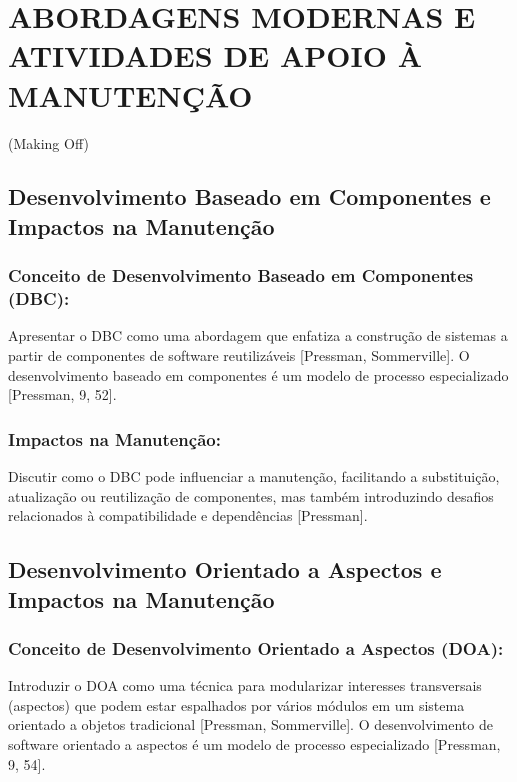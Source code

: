 \documentclass[
]{book}
\begin{document}
\chapter{ABORDAGENS MODERNAS E ATIVIDADES DE APOIO À MANUTENÇÃO}\label{abordagens-modernas-e-atividades-de-apoio-uxe0-manutenuxe7uxe3o}

(Making Off)

\section{Desenvolvimento Baseado em Componentes e Impactos na Manutenção}\label{desenvolvimento-baseado-em-componentes-e-impactos-na-manutenuxe7uxe3o}

\subsection{Conceito de Desenvolvimento Baseado em Componentes (DBC):}\label{conceito-de-desenvolvimento-baseado-em-componentes-dbc}

Apresentar o DBC como uma abordagem que enfatiza a construção de sistemas a partir de componentes de software reutilizáveis {[}Pressman, Sommerville{]}. O desenvolvimento baseado em componentes é um modelo de processo especializado {[}Pressman, 9, 52{]}.

\subsection{Impactos na Manutenção:}\label{impactos-na-manutenuxe7uxe3o}

Discutir como o DBC pode influenciar a manutenção, facilitando a substituição, atualização ou reutilização de componentes, mas também introduzindo desafios relacionados à compatibilidade e dependências {[}Pressman{]}.

\section{Desenvolvimento Orientado a Aspectos e Impactos na Manutenção}\label{desenvolvimento-orientado-a-aspectos-e-impactos-na-manutenuxe7uxe3o}

\subsection{Conceito de Desenvolvimento Orientado a Aspectos (DOA):}\label{conceito-de-desenvolvimento-orientado-a-aspectos-doa}

Introduzir o DOA como uma técnica para modularizar interesses transversais (aspectos) que podem estar espalhados por vários módulos em um sistema orientado a objetos tradicional {[}Pressman, Sommerville{]}. O desenvolvimento de software orientado a aspectos é um modelo de processo especializado {[}Pressman, 9, 54{]}.
\end{document}
